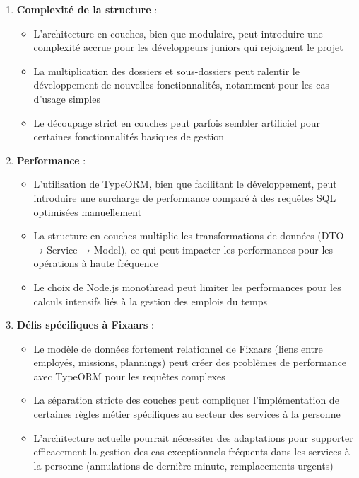 \begin{enumerate}
    \item \textbf{Complexité de la structure} : 
    \begin{itemize}
        \item L'architecture en couches, bien que modulaire, peut introduire une complexité accrue pour les développeurs juniors qui rejoignent le projet
        \item La multiplication des dossiers et sous-dossiers peut ralentir le développement de nouvelles fonctionnalités, notamment pour les cas d'usage simples
        \item Le découpage strict en couches peut parfois sembler artificiel pour certaines fonctionnalités basiques de gestion
    \end{itemize}

    \item \textbf{Performance} :
    \begin{itemize}
        \item L'utilisation de TypeORM, bien que facilitant le développement, peut introduire une surcharge de performance comparé à des requêtes SQL optimisées manuellement
        \item La structure en couches multiplie les transformations de données (DTO → Service → Model), ce qui peut impacter les performances pour les opérations à haute fréquence
        \item Le choix de Node.js monothread peut limiter les performances pour les calculs intensifs liés à la gestion des emplois du temps
    \end{itemize}

    \item \textbf{Défis spécifiques à Fixaars} :
    \begin{itemize}
        \item Le modèle de données fortement relationnel de Fixaars (liens entre employés, missions, plannings) peut créer des problèmes de performance avec TypeORM pour les requêtes complexes
        \item La séparation stricte des couches peut compliquer l'implémentation de certaines règles métier spécifiques au secteur des services à la personne
        \item L'architecture actuelle pourrait nécessiter des adaptations pour supporter efficacement la gestion des cas exceptionnels fréquents dans les services à la personne (annulations de dernière minute, remplacements urgents)
    \end{itemize}
\end{enumerate}

